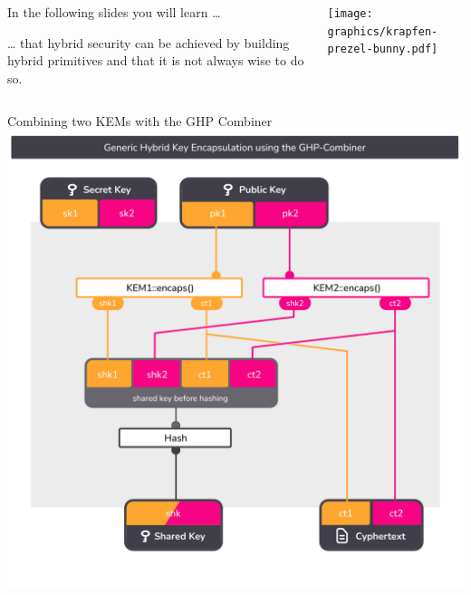 \begin{frame}[light,s]{}
  \vspace{1cm}
  \large
  \vollkorn

  \begin{columns}[c]
    \begin{column}{.30\linewidth}


      In the following slides you will learn …
      \par\vspace{1.5em}
      … that hybrid security can be achieved by building hybrid primitives and that it is not always wise to do so.
    \end{column}

    \begin{column}{.40\linewidth}
      \texttt{[image: graphics/krapfen-prezel-bunny.pdf]}
    \end{column}
  \end{columns}
\end{frame}

\begin{frame}{Combining two KEMs with the GHP Combiner}
  \centering
  \includegraphics[height=.92\textheight,page=1,clip=true,trim={0.5cm 1cm 0.7cm 1.5cm}]{graphics/rosenpass-encapsulation-combiner.pdf}
\end{frame}


